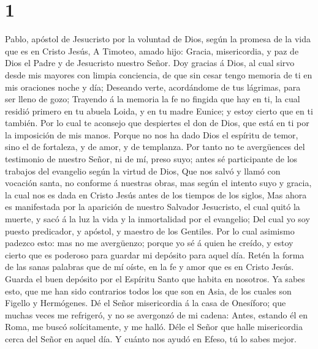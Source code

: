 \hypertarget{section}{%
\section{1}\label{section}}

 Pablo, apóstol de Jesucristo por la voluntad de Dios, según
la promesa de la vida que es en Cristo Jesús,  A Timoteo,
amado hijo: Gracia, misericordia, y paz de Dios el Padre y de Jesucristo
nuestro Señor.  Doy gracias á Dios, al cual sirvo desde mis
mayores con limpia conciencia, de que sin cesar tengo memoria de ti en
mis oraciones noche y día;  Deseando verte, acordándome de
tus lágrimas, para ser lleno de gozo;  Trayendo á la memoria
la fe no fingida que hay en ti, la cual residió primero en tu abuela
Loida, y en tu madre Eunice; y estoy cierto que en ti también.
 Por lo cual te aconsejo que despiertes el don de Dios, que
está en ti por la imposición de mis manos.  Porque no nos ha
dado Dios el espíritu de temor, sino el de fortaleza, y de amor, y de
templanza.  Por tanto no te avergüences del testimonio de
nuestro Señor, ni de mí, preso suyo; antes sé participante de los
trabajos del evangelio según la virtud de Dios,  Que nos
salvó y llamó con vocación santa, no conforme á nuestras obras, mas
según el intento suyo y gracia, la cual nos es dada en Cristo Jesús
antes de los tiempos de los siglos,  Mas ahora es
manifestada por la aparición de nuestro Salvador Jesucristo, el cual
quitó la muerte, y sacó á la luz la vida y la inmortalidad por el
evangelio;  Del cual yo soy puesto predicador, y apóstol, y
maestro de los Gentiles.  Por lo cual asimismo padezco
esto: mas no me avergüenzo; porque yo sé á quien he creído, y estoy
cierto que es poderoso para guardar mi depósito para aquel día.
 Retén la forma de las sanas palabras que de mí oíste, en
la fe y amor que es en Cristo Jesús.  Guarda el buen
depósito por el Espíritu Santo que habita en nosotros.  Ya
sabes esto, que me han sido contrarios todos los que son en Asia, de los
cuales son Figello y Hermógenes.  Dé el Señor misericordia
á la casa de Onesíforo; que muchas veces me refrigeró, y no se avergonzó
de mi cadena:  Antes, estando él en Roma, me buscó
solícitamente, y me halló.  Déle el Señor que halle
misericordia cerca del Señor en aquel día. Y cuánto nos ayudó en Efeso,
tú lo sabes mejor.

